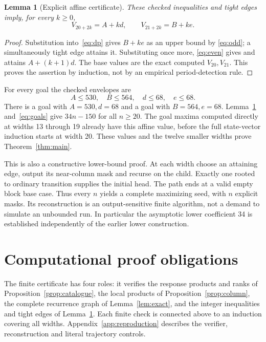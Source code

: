 \documentclass[11pt]{article}
\newtheorem{lemma}[theorem]{Lemma}
\theoremstyle{definition}\newtheorem{definition}[theorem]{Definition}
\begin{document}
\begin{lemma}[Explicit affine certificate]\label{lem:affine}
These checked inequalities and tight edges imply, for every $k\ge0$,
\[
 V_{20+2k}=A+kd,\qquad V_{21+2k}=B+ke.
\]
\end{lemma}
\begin{proof}
Substitution into~\eqref{eq:dp} gives $B+ke$ as an upper bound by
\eqref{eq:odd}; a simultaneously tight edge attains it. Substituting once more,
\eqref{eq:even} gives and attains $A+(k+1)d$. The base values are the exact
computed $V_{20},V_{21}$. This proves the assertion by induction, not by an
empirical period-detection rule.
\end{proof}

For every goal the checked envelopes are
\[
 A\le530,\quad B\le564,\quad d\le68,\quad e\le68.
\]
There is a goal with $A=530,d=68$ and a goal with $B=564,e=68$.
Lemma~\ref{lem:affine} and~\eqref{eq:goals} give $34n-150$ for all $n\ge20$.
The goal maxima computed directly at widths 13 through 19 already have
this affine value, before the full state-vector induction starts at width 20.
These values and the twelve smaller widths prove
Theorem~\ref{thm:main}.

This is also a constructive lower-bound proof. At each width choose an attaining
edge, output its near-column mask and recurse on the child. Exactly one rooted
to ordinary transition supplies the initial head. The path ends at a valid empty
block base case. Thus every $n$ yields a complete maximizing seed, with $n$
explicit masks. Its reconstruction is an output-sensitive finite algorithm,
not a demand to simulate an unbounded run. In particular the asymptotic lower
coefficient 34 is established independently of the earlier lower construction.





\section{Computational proof obligations}
The finite certificate has four roles: it verifies the response products and
ranks of Proposition~\ref{prop:catalogue}, the local products of
Proposition~\ref{prop:column}, the complete recurrence graph of
Lemma~\ref{lem:exact}, and the integer inequalities and tight edges of
Lemma~\ref{lem:affine}. Each finite check is connected above to an induction
covering all widths. Appendix~\ref{app:reproduction} describes the verifier,
reconstruction and literal trajectory controls.
\end{document}
